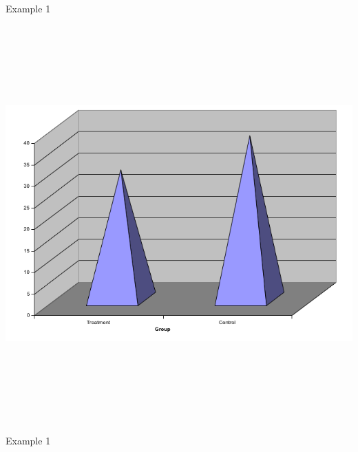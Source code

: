 \documentclass[12pt]{article}
\newcommand{\headsize}{\fontsize{35}{35} \selectfont}
\begin{document}
\newpage


\headsize \color{myyellow}
\hfill \begin{minipage}{5.75in}
\centering
Example 1
\end{minipage}

\vspace{30mm}

\centerline{\includegraphics[height=6in]{Figs/fig1f.png}}


\newpage


\headsize \color{myyellow}
\hfill \begin{minipage}{5.75in}
\centering
Example 1
\end{minipage}

\vspace{30mm}
\end{document}
